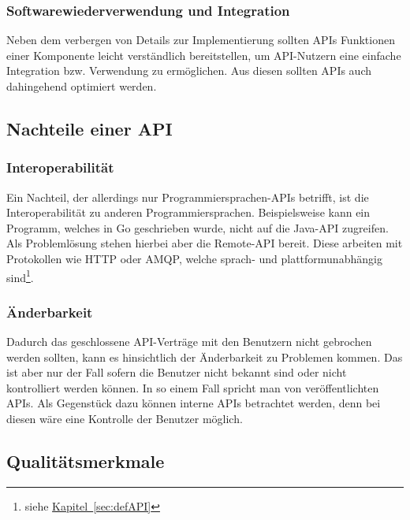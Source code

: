 \subsubsection{Softwarewiederverwendung und Integration}
Neben dem verbergen von Details zur Implementierung sollten \glspl{API} Funktionen einer Komponente leicht verständlich bereitstellen, um \gls{API}-Nutzern eine einfache Integration bzw. Verwendung zu ermöglichen. Aus diesen sollten \glspl{API} auch dahingehend optimiert werden.

\subsection{Nachteile einer \gls{API}}
\subsubsection{Interoperabilität}
Ein Nachteil, der allerdings nur Programmiersprachen-\glspl{API} betrifft, ist die Interoperabilität zu anderen Programmiersprachen. Beispielsweise kann ein Programm, welches in Go geschrieben wurde, nicht auf die Java-\gls{API} zugreifen. Als Problemlösung stehen hierbei aber die Remote-\gls{API} bereit. Diese arbeiten mit Protokollen wie \gls{HTTP} oder \gls{AMQP}, welche sprach- und plattformunabhängig sind\footnote{siehe \hyperref[sec:defAPI]{Kapitel~\ref{sec:defAPI}}}.

\subsubsection{Änderbarkeit}
Dadurch das geschlossene \gls{API}-Verträge mit den Benutzern nicht gebrochen werden sollten, kann es hinsichtlich der Änderbarkeit zu Problemen kommen. Das ist aber nur der Fall sofern die Benutzer nicht bekannt sind oder nicht kontrolliert werden können. In so einem Fall spricht man von veröffentlichten \glspl{API}. Als Gegenstück dazu können interne \glspl{API} betrachtet werden, denn bei diesen wäre eine Kontrolle der Benutzer möglich.

\subsection{Qualitätsmerkmale}\label{sec:qualityFeatures}
